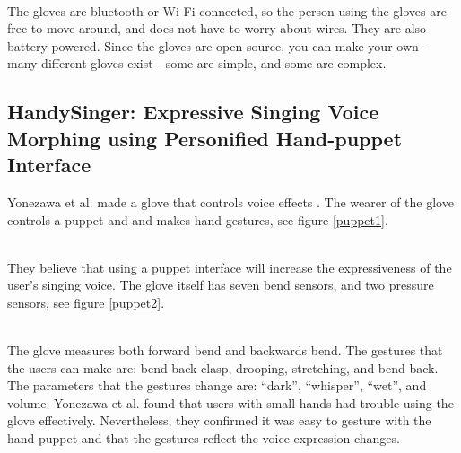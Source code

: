 \begin{minipage}{\linewidth}%
\label{mimu}
\end{minipage}\\

The gloves are bluetooth or Wi-Fi connected, so the person using the gloves are free to move around, and does not have to worry about wires. They are also battery powered. 
Since the gloves are open source, you can make your own - many different gloves exist - some are simple, and some are complex.

\subsection{HandySinger: Expressive Singing Voice Morphing using Personified Hand-puppet Interface}

Yonezawa et al. made a glove that controls voice effects \citep{Yonezawa_2005}. The wearer of the glove controls a puppet and and makes hand gestures, see figure \ref{puppet1}. \\

\begin{minipage}{\linewidth}%
\label{puppet1}
\end{minipage}\\

They believe that using a puppet interface will increase the expressiveness of the user’s singing voice. The glove itself has seven bend sensors, and two pressure sensors, see figure \ref{puppet2}. \\

\begin{minipage}{\linewidth}%
\label{puppet2}
\end{minipage}\\

The glove measures both forward bend and backwards bend. The gestures that the users can make are: bend back clasp, drooping, stretching, and bend back. The parameters that the gestures change are: “dark”, “whisper”, “wet”, and volume. Yonezawa et al. found that users with small hands had trouble using the glove effectively. Nevertheless, they confirmed it was easy to gesture with the hand-puppet and that the gestures reflect the voice expression changes.


